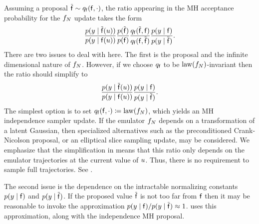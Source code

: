 \documentclass[12pt]{article}
\begin{document}
 Assuming a proposal 
$\tilde{\mathsf{f}} \sim q_{\mathsf{f}}(\mathsf{f}, \cdot)$, the ratio appearing in the MH acceptance
probability for the $f_{N}$ update takes the form 
\begin{align}
\frac{p(y \mid \tilde{\mathsf{f}}(u))}{p(y \mid \mathsf{f}(u))} \frac{p(\tilde{\mathsf{f}})}{p(\mathsf{f})} 
\frac{q_{\mathsf{f}}(\tilde{\mathsf{f}}, \mathsf{f})}{q_{\mathsf{f}}(\mathsf{f}, \tilde{\mathsf{f}})} \frac{p(y \mid \mathsf{f})}{p(y \mid \tilde{\mathsf{f}})}.
\end{align}
There are two issues to deal with here. The first is the proposal and the infinite dimensional nature of $f_{N}$.
However, if we choose $q_{\mathsf{f}}$ to be $\mathrm{law}(f_{N})$-invariant then the ratio should simplify to
\begin{align}
\frac{p(y \mid \tilde{\mathsf{f}}(u))}{p(y \mid \mathsf{f}(u))} \frac{p(y \mid \mathsf{f})}{p(y \mid \tilde{\mathsf{f}})}.
\label{eq:MH-ratio-prior-invariant}
\end{align}
The simplest option is to set $q_{\mathsf{f}}(\mathsf{f}, \cdot) \coloneqq \mathrm{law}(f_{N})$, which yields an MH independence
sampler update. If the emulator $f_{N}$ depends on a transformation of a latent Gaussian, then 
specialized alternatives such as the preconditioned Crank-Nicolson proposal, or an elliptical slice
sampling update, may be considered. We emphasize that the simplification in 
 means that this ratio only depends on the emulator trajectories at the current 
value of $u$. Thus, there is no requirement to sample full trajectories. See .

The second issue is the dependence on the intractable normalizing constants 
$p(y \mid \mathsf{f})$ and $p(y \mid \tilde{\mathsf{f}})$. 
If the proposed value $\tilde{\mathsf{f}}$ is not too far from $\mathsf{f}$ then it may be reasonable to invoke the 
approximation $p(y \mid \mathsf{f}) / p(y \mid \tilde{\mathsf{f}}) \approx 1$.
 uses this approximation, along with the independence MH proposal.
\end{document}
